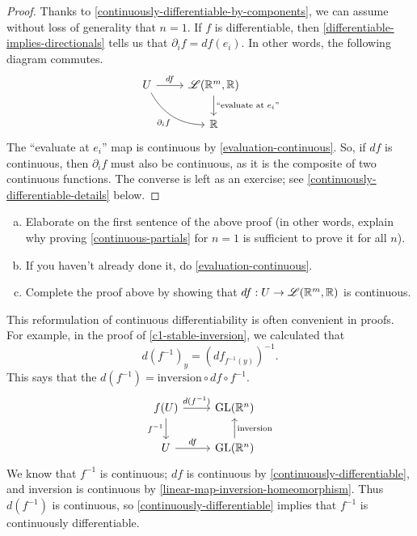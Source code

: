 \begin{proof}
	Thanks to \cref{continuously-differentiable-by-components}, we can assume without loss of generality that $n = 1$. If $f$ is differentiable, then \cref{differentiable-implies-directionals} tells us that $\partial_i f = df(e_i)$. In other words, the following diagram commutes.
	\[ \begin{tikzcd} U \ar{r}{df} \ar[bend right]{dr}[swap]{\partial_i f} & \mathscr{L}(\R^m, \R) \ar{d}{\text{``evaluate at $e_i$''}} \\ & \R \end{tikzcd} \]
	The ``evaluate at $e_i$'' map is continuous by \cref{evaluation-continuous}. So, if $df$ is continuous, then $\partial_i f$ must also be continuous, as it is the composite of two continuous functions. The converse is left as an exercise; see \cref{continuously-differentiable-details} below. 
\end{proof}

\begin{exercise} \label{continuously-differentiable-details}
	\begin{enumerate}[(a)]
		\item Elaborate on the first sentence of the above proof (in other words, explain why proving \cref{continuous-partials} for $n = 1$ is sufficient to prove it for all $n$). 
		\item If you haven't already done it, do \cref{evaluation-continuous}. 
		\item Complete the proof above by showing that $df : U \to \mathscr{L}(\mathbb{R}^m, \mathbb{R})$ is continuous. 
	\end{enumerate}
\end{exercise}

\begin{remark}
	This reformulation of continuous differentiability is often convenient in proofs. For example, in the proof of \cref{c1-stable-inversion}, we calculated that
	\[ d(f^{-1})_y = (df_{f^{-1}(y)})^{-1}. \]
	This says that the $d(f^{-1}) = \text{inversion} \circ df \circ f^{-1}$. 
	\[ \begin{tikzcd} f(U) \ar{d}[swap]{f^{-1}} \ar{r}{d(f^{-1})} & \GL(\R^n) \\ U \ar{r}{df} & \GL(\R^n) \ar{u}[swap]{\text{inversion}}  \end{tikzcd} \]
	We know that $f^{-1}$ is continuous; $df$ is continuous by \cref{continuously-differentiable}, and inversion is continuous by \cref{linear-map-inversion-homeomorphism}. Thus $d(f^{-1})$ is continuous, so \cref{continuously-differentiable} implies that $f^{-1}$ is continuously differentiable. 
\end{remark}


